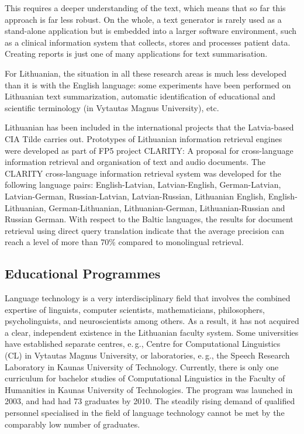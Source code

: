 \begin{multicols}{2}
This requires a deeper understanding of the text, which means that so far this approach is far less robust. On the whole, a text generator is rarely used as a stand-alone application but is embedded into a larger software environment, such as a clinical information system that collects, stores and processes patient data. Creating reports is just one of many applications for text summarisation. 

 For Lithuanian, the situation in all these research areas is much less developed than it is with the English language: some experiments have been performed on Lithuanian text summarization, automatic identification of educational and scientific terminology (in Vytautas Magnus University), etc.

Lithuanian has been included in the international projects that the Latvia-based CIA Tilde carries out. Prototypes of Lithuanian information retrieval engines were developed as part of FP5 project CLARITY: A proposal for cross-language information retrieval and organisation of text and audio documents. The CLARITY cross-language information retrieval system was developed for the following language pairs:  English-Latvian, Latvian-English, German-Latvian, Latvian-German, Russian-Latvian, Latvian-Russian, Lithuanian English, English-Lithuanian, German-Lithuanian, Lithuanian-German, Lithuanian-Russian and Russian German. With respect to the Baltic languages, the results for document retrieval using direct query translation indicate that the average precision can reach a level of more than 70\% compared to monolingual retrieval.

\subsection{Educational Programmes}

 Language technology is a very interdisciplinary field that involves the combined expertise of linguists, computer scientists, mathematicians, philosophers, psycholinguists, and neuroscientists among others. As a result, it has not acquired a clear, independent existence in the Lithuanian faculty system. Some universities have established separate centres, e.\,g., Centre for Computational Linguistics (CL) in Vytautas Magnus University, or laboratories, e.\,g., the Speech Research Laboratory in Kaunas University of Technology. Currently, there is only one curriculum for bachelor studies of Computational Linguistics in the Faculty of Humanities in Kaunas University of Technologies. The program was launched in 2003, and had had 73 graduates by 2010. The steadily rising demand of qualified personnel specialised in the field of language technology cannot be met by the comparably low number of graduates.


\end{multicols}
